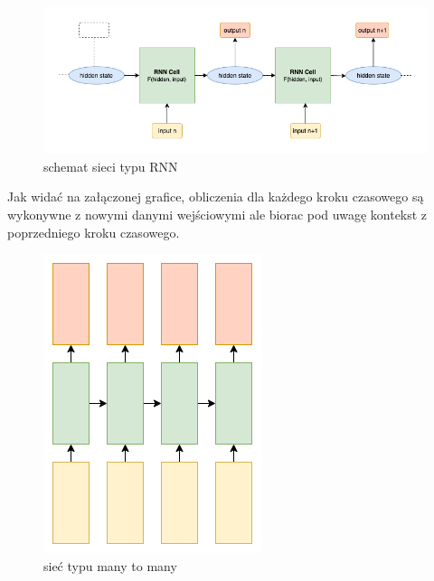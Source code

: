 \begin{figure}[!ht]
\includegraphics[width=\linewidth]{./images/rnn.png}
\caption{schemat sieci typu RNN}
\label{fig:test3}
\end{figure}
Jak widać na załączonej grafice, obliczenia dla każdego kroku czasowego są wykonywne z nowymi danymi wejściowymi
ale biorac pod uwagę kontekst z poprzedniego kroku czasowego. 
\begin{figure}
\vspace{-4mm}
\includegraphics[width=\linewidth]{./images/many-to-many.png}
\caption{sieć typu many to many}
\label{fig:test3}
\vspace{-4mm}
\end{figure}
